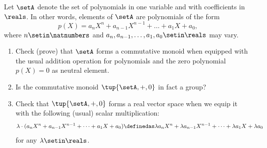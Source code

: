 \begin{gradedexercise}
    \label{ex:real-polynomials}
    Let $\setA$ denote the set of polynomials in one variable and with coefficients in $\reals$.
    In other words, elements of $\setA$ are polynomials of the form
    \begin{equation}
        p(X) = a_nX^n + a_{n-1}
        X^{n-1} + \dots + a_1X + a_0,
    \end{equation}
    where $n \setin \natnumbers$ and $a_n, a_{n-1}, \dots, a_1, a_0 \setin \reals$ may vary.

    \begin{enumerate}
        \item Check (prove) that $\setA$ forms a commutative monoid when equipped with the usual addition operation for polynomials and the zero polynomial $p(X) = 0$ as neutral element.
        \item Is the commutative monoid $\tup{\setA, +, 0}$ in fact a group?
        \item Check that $\tup{\setA, +, 0}$ forms a real vector space when we equip it with the following (usual) scalar multiplication:
              \begin{equation}
                  \lambda \cdot (a_nX^n + a_{n-1}
                  X^{n-1} + \dots + a_1X + a_0) \definedas \lambda a_nX^n + \lambda a_{n-1}X^{n-1} + \dots + \lambda a_1X + \lambda a_0
              \end{equation}
              for any $\lambda \setin \reals$.
    \end{enumerate}
\end{gradedexercise}


